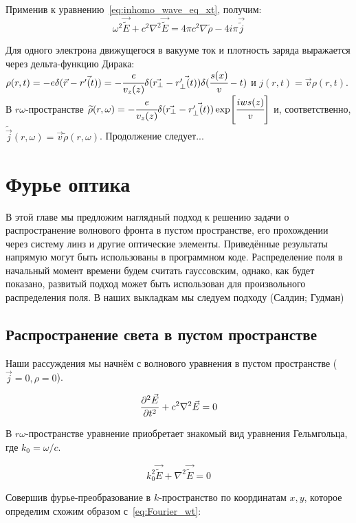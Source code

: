 \documentclass[14pt,a4paper]{extarticle}
\numberwithin{equation}{section}
\begin{document}
Применив к уравнению~\ref{eq:inhomo_wave_eq_xt}, получим:
\begin{equation}
	\omega^2 \vec{\widetilde{E}} + c^2 \nabla^2 \vec{\widetilde{E}} = 4\pi c^2 \nabla  \widetilde{\rho} - 4i\pi \vec{\widetilde{j}}
\end{equation}

Для одного электрона движущегося в вакууме ток и плотность заряда выражается через дельта-функцию Дирака: $\rho(r,t) = -e\delta(\vec{r}- \vec{r'(t)}) = -\cfrac{e}{v_z(z)}\delta(\vec{r_{\bot}}- \vec{r'_{\bot}(t)})\delta(\cfrac{s(x)}{v} - t)$ и $j(r,t) = \vec{v}\rho(r,t)$. В $r\omega$-пространстве $\widetilde{\rho}(r,\omega) = -\cfrac{e}{v_z(z)}\delta(\vec{r_{\bot}}- \vec{r'_{\bot}(t)})\exp[\cfrac{iws(z)}{v}]$ и, соответственно, $\widetilde{\vec{j}}(r,\omega) = \vec{v}\widetilde{\rho}(r,\omega)$. Продолжение следует...
 
\section{Фурье оптика}
В этой главе мы предложим наглядный подход к решению задачи о распространение волнового фронта в пустом пространстве, его прохождении через систему линз и другие оптические элементы. Приведённые результаты напрямую могут быть использованы в программном коде. Распределение поля в начальный момент времени будем считать гауссовским, однако, как будет показано, развитый подход может быть использован для произвольного распределения поля. В наших выкладкам мы следуем подходу (Салдин; Гудман)
\subsection{Распространение света в пустом пространстве}
Наши рассуждения мы начнём с волнового уравнения в пустом пространстве ($\vec{j} = 0, \rho = 0$). 

\begin{equation}
	\pdv[2]{\vec{E}}{t} + c^2 \nabla^2 \vec{E} = 0
\end{equation}

В  $r\omega$-пространстве уравнение приобретает знакомый вид уравнения Гельмгольца, где $k_0 = \omega/c$.

\begin{equation}
	k_0^2\vec{\widetilde{E}} + \nabla^2 \vec{\widetilde{E}} = 0
\end{equation}

Совершив фурье-преобразование в $k$-пространство по координатам $x,y$, которое определим схожим образом с~\ref{eq:Fourier_wt}:
\end{document}

